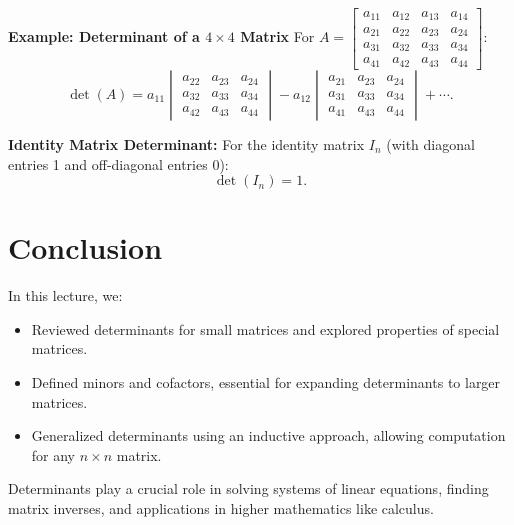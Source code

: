 \documentclass{article}
\begin{document}
\textbf{Example: Determinant of a $4 \times 4$ Matrix}
For $A =
\begin{bmatrix}
  a_{11} & a_{12} & a_{13} & a_{14} \\
  a_{21} & a_{22} & a_{23} & a_{24} \\
  a_{31} & a_{32} & a_{33} & a_{34} \\
  a_{41} & a_{42} & a_{43} & a_{44}
\end{bmatrix}$:
\[
  \det(A) = a_{11}
  \begin{vmatrix}
    a_{22} & a_{23} & a_{24} \\
    a_{32} & a_{33} & a_{34} \\
    a_{42} & a_{43} & a_{44}
  \end{vmatrix}
  - a_{12}
  \begin{vmatrix}
    a_{21} & a_{23} & a_{24} \\
    a_{31} & a_{33} & a_{34} \\
    a_{41} & a_{43} & a_{44}
  \end{vmatrix}
  + \cdots.
\]

\textbf{Identity Matrix Determinant:}
For the identity matrix $I_n$ (with diagonal entries 1 and off-diagonal entries 0):
\[
  \det(I_n) = 1.
\]

\section*{Conclusion}

In this lecture, we:
\begin{itemize}
  \item Reviewed determinants for small matrices and explored properties of special matrices.
  \item Defined minors and cofactors, essential for expanding determinants to larger matrices.
  \item Generalized determinants using an inductive approach, allowing computation for any $n \times n$ matrix.
\end{itemize}

Determinants play a crucial role in solving systems of linear equations, finding matrix inverses, and applications in higher mathematics like calculus.
\end{document}
